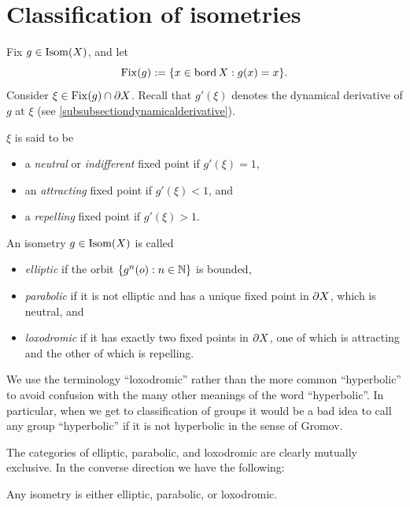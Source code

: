 \section{Classification of isometries}
Fix $g\in\operatorname{Isom}(X)$, and let
\[
\operatorname{Fix}(g) := \{x\in\operatorname{bord} X:g(x) = x\}.
\]
Consider $\xi\in\operatorname{Fix}(g)\cap\partial X$. Recall that $g'(\xi)$ denotes the dynamical derivative of $g$ at $\xi$ (see \6\ref{subsubsectiondynamicalderivative}). 
\begin{definition}
\label{definitionderivativefixedpoint}
$\xi$ is said to be
\begin{itemize}
\item a \emph{neutral} or \emph{indifferent} fixed point if $g'(\xi) = 1$,
\item an \emph{attracting} fixed point if $g'(\xi) < 1$, and
\item a \emph{repelling} fixed point if $g'(\xi) > 1$.
\end{itemize}
\end{definition}

\begin{definition}
\label{definitionclassification1}
An isometry $g\in\operatorname{Isom}(X)$ is called
\begin{itemize}
\item \emph{elliptic} if the orbit $\{g^n(\zero):n\in\N\}$ is bounded,
\item \emph{parabolic} if it is not elliptic and has a unique fixed point in $\partial X$, which is neutral, and
\item \emph{loxodromic} if it has exactly two fixed points in $\partial X$, one of which is attracting and the other of which is repelling.
\end{itemize}
\end{definition}
\begin{remark}
We use the terminology ``loxodromic'' rather than the more common ``hyperbolic'' to avoid confusion with the many other meanings of the word ``hyperbolic''. In particular, when we get to classification of groups it would be a bad idea to call any group ``hyperbolic'' if it is not hyperbolic in the sense of Gromov.
\end{remark}

The categories of elliptic, parabolic, and loxodromic are clearly mutually exclusive. In the converse direction we have the following:
\begin{theorem}
\label{classificationofisometries}
Any isometry is either elliptic, parabolic, or loxodromic.
\end{theorem}

